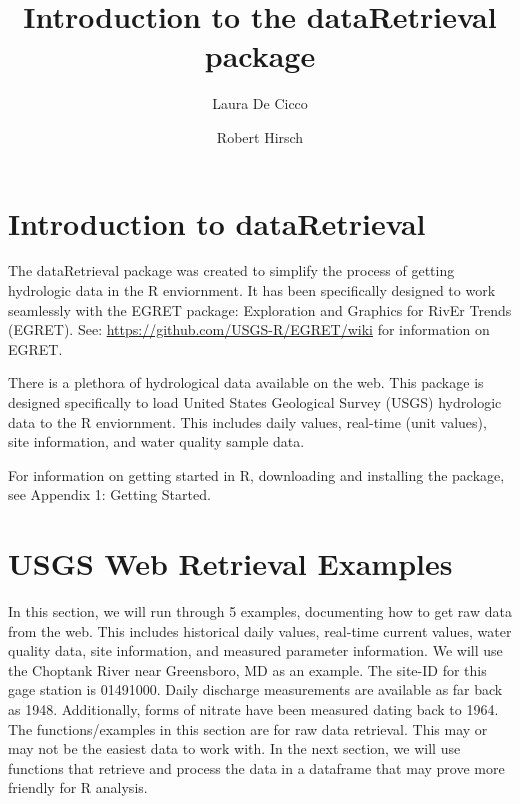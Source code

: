\documentclass[a4paper,11pt]{article}
\begin{document}


\title{Introduction to the dataRetrieval package}
\author[1]{Laura De Cicco}
\author[1]{Robert Hirsch}



\maketitle
\tableofcontents

\section{Introduction to dataRetrieval}
The dataRetrieval package was created to simplify the process of getting hydrologic data in the R enviornment. It has been specifically designed to work seamlessly with the EGRET package: Exploration and Graphics for RivEr Trends (EGRET). See: \url{https://github.com/USGS-R/EGRET/wiki} for information on EGRET.

There is a plethora of hydrological data available on the web. This package is designed specifically to load United States Geological Survey (USGS) hydrologic data to the R enviornment. This includes daily values, real-time (unit values), site information, and water quality sample data. 

For information on getting started in R, downloading and installing the package, see Appendix 1: Getting Started.


\section{USGS Web Retrieval Examples}
In this section, we will run through 5 examples, documenting how to get raw data from the web. This includes historical daily values, real-time current values, water quality data, site information, and measured parameter information. We will use the Choptank River near Greensboro, MD as an example.  The site-ID for this gage station is 01491000. Daily discharge measurements are available as far back as 1948.  Additionally, forms of nitrate have been measured dating back to 1964. The functions/examples in this section are for raw data retrieval.  This may or may not be the easiest data to work with.  In the next section, we will use functions that retrieve and process the data in a dataframe that may prove more friendly for R analysis.
\end{document}
